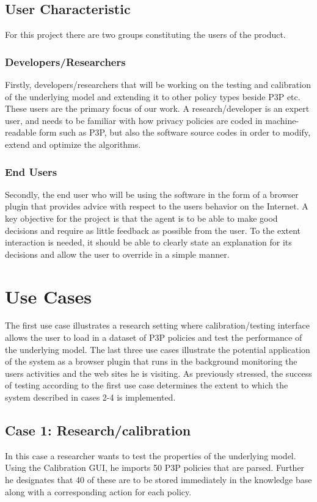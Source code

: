 \subsection{User Characteristic}

For this project there are two groups constituting the users of the product. 
\subsubsection{Developers/Researchers}
Firstly, developers/researchers that will be working on the testing and calibration of the underlying model and extending it to other policy types beside P3P etc. These users are the primary focus of our work. A research/developer is an expert user, and needs to be familiar with how privacy policies are coded in machine-readable form such as P3P, but also the software source codes in order to modify, extend and optimize the algorithms. 

\subsubsection{End Users}
Secondly, the end user who will be using the software in the form of a browser plugin that provides advice with respect to the users behavior on the Internet. A key objective for the project is that the agent is to be able to make good decisions and require as little feedback as possible from the user. To the extent interaction is needed, it should be able to clearly state an explanation for its decisions and allow the user to override in a simple manner.


\section{Use Cases}\label{useCase}

The first use case illustrates a research setting where calibration/testing interface allows the user to load in a dataset of P3P policies and test the performance of the underlying model. The last three use cases illustrate the potential application of the system as a browser plugin that runs in the background monitoring the users activities and the web sites he is visiting. As previously stressed, the success of testing according to the first use case determines the extent to which the system described in cases 2-4 is implemented.

\subsection{Case 1: Research/calibration}
In this case a researcher wants to test the properties of the underlying model. Using the Calibration GUI, he imports 50 P3P policies that are parsed. Further he designates that 40 of these are to be stored immediately in the knowledge base along with a corresponding action for each policy.

